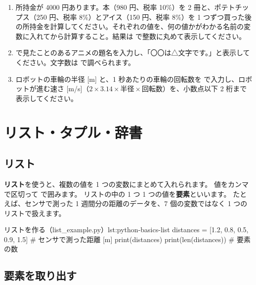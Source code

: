\begin{exercise}
\begin{enumerate}
  \item 所持金が 4000 円あります。本（980 円、税率 10\%）を 2 冊と、ポテトチップス（250 円、税率 8\%）とアイス（150 円、税率 8\%）を 1 つずつ買った後の所持金を計算してください。それぞれの値を、何の値かがわかる名前の変数に入れてから計算すること。結果は  で整数に丸めて表示してください。
  \item {} で見たことのあるアニメの題名を入力し、「〇〇は△文字です。」と表示してください。文字数は  で調べられます。
  \item ロボットの車輪の半径 [m] と、1 秒あたりの車輪の回転数を  で入力し、ロボットが進む速さ [m/s]（$2 \times 3.14 \times \text{半径} \times \text{回転数}$）を、小数点以下 2 桁まで表示してください。
\end{enumerate}
\end{exercise}

\section{リスト・タプル・辞書}
\label{sec:python-basics-list}

\subsection{リスト}

\textbf{リスト}を使うと、複数の値を 1 つの変数にまとめて入れられます。
値をカンマで区切って \cmd{[ ]} で囲みます。
リストの中の 1 つ 1 つの値を\textbf{要素}といいます。
たとえば、センサで測った 1 週間分の距離のデータを、7 個の変数ではなく 1 つのリストで扱えます。

\begin{codelisting}[style=python]{リストを作る（list\_example.py）}{lst:python-basics-list}
distances = [1.2, 0.8, 0.5, 0.9, 1.5]   # センサで測った距離 [m]
print(distances)
print(len(distances))   # 要素の数
\end{codelisting}


\subsection{要素を取り出す}

